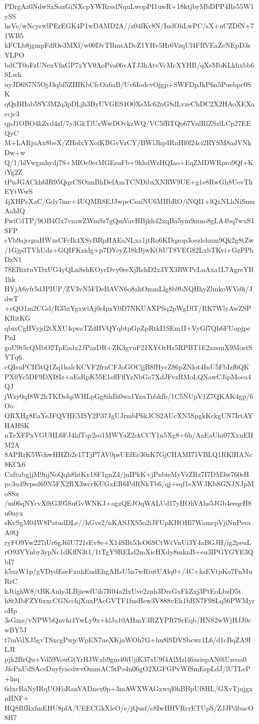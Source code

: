 PDrgAz0NdwSxSoaGiNXcpYWRrsslNquLwopPI1uwR+18ktjbyMbDPP4Re55W1ySS
hsVs/wNcyswlPErEGK4P1wDAMD2A//z04fKv8N/IudOhLwPC/sX+nCZDfN+71WB5
kFCLb8jgmpFdfOe3MXf/w00DvTBmsADcZ1YHv5Hr6VzqUl4FRVEaZeNEpD3sYLPO
bdCT0oFzUNexVfnGP7xYV0AoPva06vATJ3hAtvVcMcXYHB/qXsMbKLkhxbb6SLwh
uyJD6S7N5OjJ3qbf5ZHIKbCfcOa6aB/Uv6IodcvOjgp+SWFDpJkP6n5Puebpc0SK
qQzBHab5SY3M2q3pDLjh3ByUVGES4O0XsMc62nG8dLvzeChDC2X2HAoXEXaccjc3
qpJ1OBO4kZvd4zl/7y3GkTlUzWwDOvkzWQ/VC5fRTQo67VulRlZSzlLCp27EEQyC
M+LARjuAx8beX/ZHolxYXoiKBGvVzCY/BWlJhp4RnHl0l24ci2RYSM8adVNkDw+w
Q/1/hlVwgmhydj7S+MIOe9erMGEsuFb+9khdWzHQIao+EqZMDWRpro9Qf+KiYg2Z
tPnJGACkh6IR95QqzCSOnnBhDelAmTCNDibxXNRW9UE+g1e8RwGh8UevThEYtWwS
4jXHPcXaC/Gdy7me+4UQMR8EJJwpcCsaiNU6MHbRO/iNQI1+lQxNLhNiSmuAahIQ
FwiCdTP/9OB4Gx7vzawZWmSr7gQmVavHBjkh42xqBa5ym9mno8gLA4bq7wxS1SFP
cVb9ajcqzaHWxsCFcIk4XSyBRpHAEaNLxa1jtRo6KDqzop3oezlchnm9Qk2g8tZw
/1Gjp3TVkUdz+GQIFKzidg+p7DYeyZJ8kBjwKOiUT8VEG82LxbTKvi+GzPPhDzN1
78EBixtuVDxUG4yQLnSshKOyrDvy0reXjRshD2x3YX3RWPcLuAxa1L7AgreYB1hk
HYjA6yfr5dJPIUP/ZV3vN5FDeBAVN6o8ahOmmLlg8b9bNQHhyZlmkoWVs0i/JdwT
+cQO1m2CGd/R35xYgxwiAj0eIpxY0D7NKUAXPSq2pWgDlT/RK7WlyAwZSPKRitKG
qbixCgHVyjd2tXXU4qwaTZdHVQYqbtpGpZpRtkI1SEm1I+VyGf7Qh6FUopjpcPnI
goU9t5cQMbO2TpEadx2JPazDR+ZK3gvuF21XYOrHz5RPBT1E2zzsmX9MostSYTq6
cQIsuPCH5tQ1Zq1halcKCVF2frnCFJoGOCjjB8fHycZ86pZNlot4InU5FbIzf6QK
PX0Yc5DF9DXI8Iz+aEsRpK55E1sffFflYzNbGa7XdJFvzRMoLQNawCJipMoea4QJ
jWzy0qI8W2hTKDsfqiWHLpGg8ihIh0wa1YzuTnbkfb/1C5NUpV1Z7QKAK4gp/6Oo
ORXHg8EaYeJFQVHEMSY2P37JgUJrmbP6kJCS2AUcXN5SpgkKckgUN7IrtAYHAHSK
nTeXFPxVGUHL6FJ4hfTqr2so1MWYaZ2ckCCY1n5Xg8+6h/AaEaUhi07XxuEIIM2A
8APRrK5WchwHHZb2e17TjP7AV0psUEfEc30zK7GjCHAMI71VBLQ1RKlHANc8KCk6
CaftubgjjM9njNoQqh8htKy18F1gnZ4/jnIPkK+jPnbieMyVzZRz7I7DM3w760sH
pc3u49vpsd69N5FX2RX3wcrKUGxER6PdRNkTb6/qj+sqf1eXWJKbSGNJNJpMo8Sx
/m06qNYcvX0iG395SuGvWNKJ+agzQEJOqWALUd17yHOhVAhs5JGb4eeqeH8u0uyx
sKvSgM04W8PatudDLe//hGvs2/nKASJXS5o2iJFUpKHOHl7WamcpVjiNnPsvaA0Q
ryFO9Vw227iUr6gJ6lU721sEv8e+X14SBt53cO6SCtWtVnUi3Y4aBGJH/ig2peuL
rO93YYnby3ypNc1dKffN3t1/1tTgY9RELd2mXicHXdy8mknB+eu3IPGYGYE3QbI7
k5xzW1p/gVDydEseFxuhEudEhgARsU5n7wRiutUAlq0+/4C+ksEVtpKo7FnMuRrC
kJtighW8/tBKAnly3LBjiewfUih7R04a2lxUve2znh3DrsGxFkZxj3PtEoLbzD5t
h8tMbFZY6xxcCGNcchjXuxPAcGVTF1fusHew3V888vEh1bBN7F98Lq56PWMyroHp
3sGms/vNPWbQnvhi4YwLy9x+klJa10AHmY3RZYPR7SrEqb/HNS2wWjHJJ0cwBY5J
t7mVdXJ5gvTSxcgPwjcWpEN7ueXKjaWOh7G+hu8lSDVSbcwr1L6/d1cBqZA9ILJI
pjk2BrQu+Vd59VouGtYrHJWxb9gm40iUjiK37xU9f4AlMzl46xsiepAN0iUzeoa0
JfePnUdSAceDuyfyacdwvOmmAC5tPo4n06gO2XGFGPvWfSmEspLdJ/lUTLeP+lnq
6dxcRaNyIRqUOFoRanVADnex0p+3mAWXWAGxwql0hBBpUf8HL/GXvTjujgxnHNF+
HQ8RfRxfmEHU8pfA/UEECGkXleO/e/jQusf/c8IwHHVRcrETUpS/ZJJPdbucO8H7
